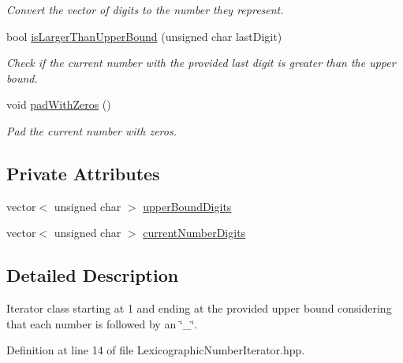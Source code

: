 \begin{DoxyCompactItemize}
\begin{DoxyCompactList}\small\item\em \-Convert the vector of digits to the number they represent. \end{DoxyCompactList}\item 
bool \hyperlink{classmultiscale_1_1LexicographicNumberIterator_a8fad6e84a483cee3bd52c926de73d15f}{is\-Larger\-Than\-Upper\-Bound} (unsigned char last\-Digit)
\begin{DoxyCompactList}\small\item\em \-Check if the current number with the provided last digit is greater than the upper bound. \end{DoxyCompactList}\item 
void \hyperlink{classmultiscale_1_1LexicographicNumberIterator_a063dc7e6097724e96ed36bab4d20871b}{pad\-With\-Zeros} ()
\begin{DoxyCompactList}\small\item\em \-Pad the current number with zeros. \end{DoxyCompactList}\end{DoxyCompactItemize}
\subsection*{\-Private \-Attributes}
\begin{DoxyCompactItemize}
\item 
vector$<$ unsigned char $>$ \hyperlink{classmultiscale_1_1LexicographicNumberIterator_a909a054ae4d3e79e5daa3059a94000d0}{upper\-Bound\-Digits}
\item 
vector$<$ unsigned char $>$ \hyperlink{classmultiscale_1_1LexicographicNumberIterator_af42ebeea695a31c2da714332c520ae79}{current\-Number\-Digits}
\end{DoxyCompactItemize}


\subsection{\-Detailed \-Description}
\-Iterator class starting at 1 and ending at the provided upper bound considering that each number is followed by an \char`\"{}\-\_\-\char`\"{}. 

\-Definition at line 14 of file \-Lexicographic\-Number\-Iterator.\-hpp.



